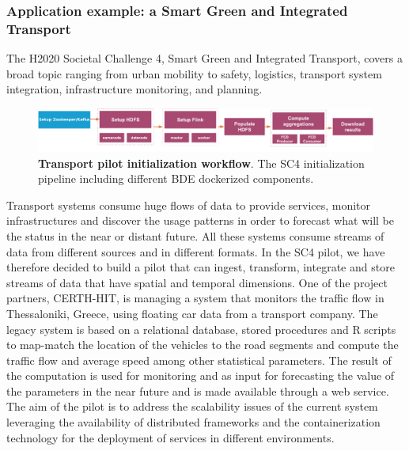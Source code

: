 \subsubsection{Application example: a Smart Green and Integrated Transport}
The H2020 Societal Challenge 4, Smart Green and Integrated Transport, covers a broad topic ranging from urban mobility to safety, logistics, transport system integration, infrastructure monitoring, and planning.
\begin{figure}[h]
\centering
	\includegraphics[width=\textwidth]{images/7_implemenation_and_usecases/SC4_Arch.pdf}
	\caption{\textbf{Transport pilot initialization workflow}.
	The SC4 initialization pipeline including different BDE dockerized components.
	}
	\label{fig:SC4-pipeline}
\end{figure}
Transport systems consume huge flows of data to provide services, monitor infrastructures and discover the usage patterns in order to forecast what will be the status in the near or distant future. 
All these systems consume streams of data from different sources and in different formats. 
In the SC4 pilot, we have therefore decided to build a pilot that can ingest, transform, integrate and store streams of data that have spatial and temporal dimensions. 
One of the project partners, CERTH-HIT, is managing a system that monitors the traffic flow in Thessaloniki, Greece, using floating car data from a transport company. 
The legacy system is based on a relational database, stored procedures and R scripts to map-match the location of the vehicles to the road segments and compute the traffic flow and average speed among other statistical parameters. 
The result of the computation is used for monitoring and as input for forecasting the value of the parameters in the near future and is made available through a web service. 
The aim of the pilot is to address the scalability issues of the current system leveraging the availability of distributed frameworks and the containerization technology for the deployment of services in different environments.

